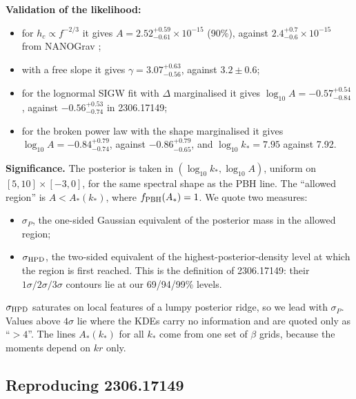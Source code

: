 \documentclass[11pt,a4paper]{article}
\newcommand{\fpbh}{f_{\rm PBH}}
\begin{document}
\textbf{Validation of the likelihood:}
\begin{itemize}
\item for $h_c\propto f^{-2/3}$ it gives $A=2.52^{+0.59}_{-0.61}\times10^{-15}$ (90\%), against
$2.4^{+0.7}_{-0.6}\times10^{-15}$ from NANOGrav \cite{NG15gwb};
\item with a free slope it gives $\gamma=3.07^{+0.63}_{-0.56}$, against $3.2\pm0.6$;
\item for the lognormal SIGW fit with $\Delta$ marginalised it gives
$\log_{10}A=-0.57^{+0.54}_{-0.84}$, against $-0.56^{+0.53}_{-0.74}$ in 2306.17149;
\item for the broken power law with the shape marginalised it gives
$\log_{10}A=-0.84^{+0.79}_{-0.74}$, against $-0.86^{+0.79}_{-0.65}$, and $\log_{10}k_*=7.95$ against 7.92.
\end{itemize}

\textbf{Significance.} The posterior is taken in $(\log_{10}k_*,\log_{10}A)$, uniform on
$[5,10]\times[-3,0]$, for the same spectral shape as the PBH line. The ``allowed region'' is
$A<A_*(k_*)$, where $\fpbh(A_*)=1$. We quote two measures:
\begin{itemize}
\item $\sigma_P$, the one-sided Gaussian equivalent of the posterior mass in the allowed region;
\item $\sigma_{\rm HPD}$, the two-sided equivalent of the highest-posterior-density level at
which the region is first reached. This is the definition of 2306.17149: their
$1\sigma/2\sigma/3\sigma$ contours lie at our 69/94/99\% levels.
\end{itemize}
$\sigma_{\rm HPD}$ saturates on local features of a lumpy posterior ridge, so we lead with
$\sigma_P$. Values above $4\sigma$ lie where the KDEs carry no information and are quoted only
as ``$>4$''. The lines $A_*(k_*)$ for all $k_*$ come from one set of $\beta$ grids, because the
moments depend on $kr$ only.

\subsection{Reproducing 2306.17149}
\end{document}
